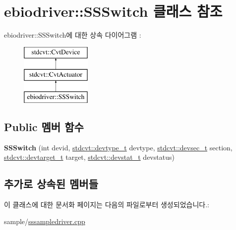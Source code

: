 \hypertarget{classebiodriver_1_1SSSwitch}{}\section{ebiodriver\+:\+:S\+S\+Switch 클래스 참조}
\label{classebiodriver_1_1SSSwitch}
ebiodriver\+:\+:S\+S\+Switch에 대한 상속 다이어그램 \+: \begin{figure}[H]
\begin{center}
\leavevmode
\includegraphics[height=3.000000cm]{classebiodriver_1_1SSSwitch}
\end{center}
\end{figure}
\subsection*{Public 멤버 함수}
\begin{DoxyCompactItemize}
\item 
{\bfseries S\+S\+Switch} (int devid, \hyperlink{cvtcode_8h_ae8e34073e35cef0bb47c7fa535fc638b}{stdcvt\+::devtype\+\_\+t} devtype, \hyperlink{cvtcode_8h_a268eebb73363e24b9e65fd51973bd9c0}{stdcvt\+::devsec\+\_\+t} section, \hyperlink{cvtcode_8h_a2b37fd5cc4d40c0b8c4b987c271e5ceb}{stdcvt\+::devtarget\+\_\+t} target, \hyperlink{cvtcode_8h_ad21cd565f839adc5b19a0993e7da7278}{stdcvt\+::devstat\+\_\+t} devstatus)\hypertarget{classebiodriver_1_1SSSwitch_a9c034c81460c009e7d97138b43ee1e2e}{}\label{classebiodriver_1_1SSSwitch_a9c034c81460c009e7d97138b43ee1e2e}

\end{DoxyCompactItemize}
\subsection*{추가로 상속된 멤버들}


이 클래스에 대한 문서화 페이지는 다음의 파일로부터 생성되었습니다.\+:\begin{DoxyCompactItemize}
\item 
sample/\hyperlink{sssampledriver_8cpp}{sssampledriver.\+cpp}\end{DoxyCompactItemize}
